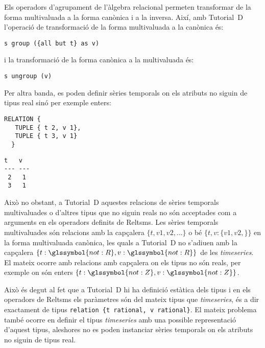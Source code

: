 Els operadors d'agrupament de l'àlgebra relacional permeten
transformar de la forma multivaluada a la forma canònica i a la
inversa. Així, amb Tutorial~D l'operació de transformació de la forma
multivaluada a la canònica és:
\begin{lstlisting}[style=tutorialD]
s group ({all but t} as v)
\end{lstlisting}
i la transformació de la forma canònica a la multivaluada és:
\begin{lstlisting}[style=tutorialD]
s ungroup (v)
\end{lstlisting}










Per altra banda, es poden definir sèries temporals on els atributs no
siguin de tipus real sinó per exemple enters:
\begin{lstlisting}[style=tutorialD]
 RELATION {
   TUPLE { t 2, v 1},
   TUPLE { t 3, v 1}
  }
\end{lstlisting}
\begin{lstlisting}[style=stdout]
 t   v 
--- ---
 2   1
 3   1
\end{lstlisting}





Això no obstant, a Tutorial~D aquestes relacions de sèries temporals
multivaluades o d'altres tipus que no siguin reals no són acceptades
com a arguments en els operadors definits de Reltsms.  Les sèries
temporals multivaluades són relacions amb la capçalera $\{t, v1, v2,
\ldots \}$ o bé $\{t, v: \{v1, v2,\} \}$ en la forma multivaluada
canònica, les quals a Tutorial~D no s'adiuen amb la capçalera
$\{t:\glssymbol{not:R}, v:\glssymbol{not:R}\}$ de les
\emph{timeseries}. El mateix ocorre amb relacions amb capçalera on
els tipus no són reals, per exemple on són enters
$\{t:\glssymbol{not:Z}, v:\glssymbol{not:Z}\}$.

Això és degut al fet que a Tutorial~D hi ha definició estàtica dels
tipus i en els operadors de Reltsms els paràmetres són del mateix
tipus que \emph{timeseries}, és a dir exactament de tipus
\lstinline[style=tutorialD]+relation {t rational, v rational}+.  El
mateix problema també ocorre en definir el tipus \emph{timeseries} amb
una possible representació d'aquest tipus, aleshores no es poden
instanciar sèries temporals on els atributs no siguin de tipus real.


